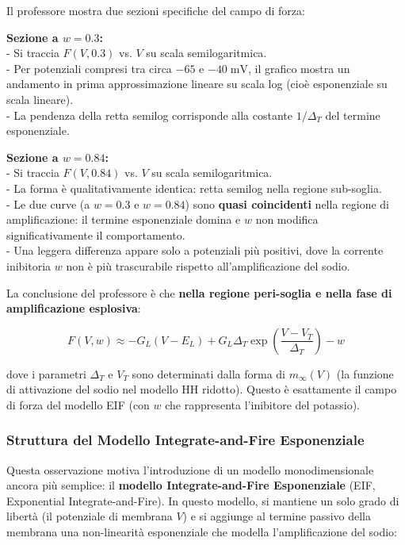 Il professore mostra due sezioni specifiche del campo di forza:

\textbf{Sezione a $w = 0.3$:}\\
- Si traccia $F(V, 0.3)$ vs. $V$ su scala semilogaritmica.\\
- Per potenziali compresi tra circa $-65$ e $-40 \; \text{mV}$, il grafico mostra un andamento in prima approssimazione lineare su scala log (cioè esponenziale su scala lineare).\\
- La pendenza della retta semilog corrisponde alla costante $1/\Delta_T$ del termine esponenziale.

\textbf{Sezione a $w = 0.84$:}\\
- Si traccia $F(V, 0.84)$ vs. $V$ su scala semilogaritmica.\\
- La forma è qualitativamente identica: retta semilog nella regione sub-soglia.\\
- Le due curve (a $w = 0.3$ e $w = 0.84$) sono \textbf{quasi coincidenti} nella regione di amplificazione: il termine esponenziale domina e $w$ non modifica significativamente il comportamento.\\
- Una leggera differenza appare solo a potenziali più positivi, dove la corrente inibitoria $w$ non è più trascurabile rispetto all'amplificazione del sodio.

La conclusione del professore è che \textbf{nella regione peri-soglia e nella fase di amplificazione esplosiva}:

\begin{equation}
F(V, w) \approx -G_L(V - E_L) + G_L \Delta_T \exp\!\left(\frac{V - V_T}{\Delta_T}\right) - w
\end{equation}

dove i parametri $\Delta_T$ e $V_T$ sono determinati dalla forma di $m_\infty(V)$ (la funzione di attivazione del sodio nel modello HH ridotto). Questo è esattamente il campo di forza del modello EIF (con $w$ che rappresenta l'inibitore del potassio).

\subsubsection{Struttura del Modello Integrate-and-Fire Esponenziale}

Questa osservazione motiva l'introduzione di un modello monodimensionale ancora più semplice: il \textbf{modello Integrate-and-Fire Esponenziale} (EIF, Exponential Integrate-and-Fire). In questo modello, si mantiene un solo grado di libertà (il potenziale di membrana $V$) e si aggiunge al termine passivo della membrana una non-linearità esponenziale che modella l'amplificazione del sodio:

